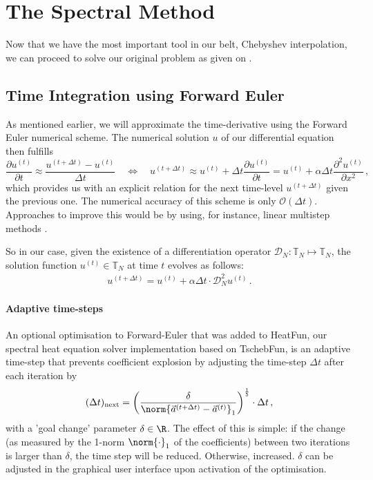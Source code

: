 \documentclass[12pt, a4paper]{article}
\newcommand{\chebyshev}{Chebyshev\xspace}
\newcommand{\tschebfun}{\textcolor{themecolor3}{TschebFun}\xspace}
\newcommand{\heatfun}{\textcolor{themecolor3}{HeatFun}\xspace}
\begin{document}

  \section{The Spectral Method}
  Now that we have the most important tool in our belt, \chebyshev interpolation, we can proceed to solve our original problem as given on .

  \subsection{Time Integration using Forward Euler}
  As mentioned earlier, we will approximate the time-derivative using the Forward Euler numerical scheme.
  The numerical solution $u$ of our differential equation then fulfills
  $$\frac{\partial u^{(t)}}{\partial t} \approx \frac{u^{(t+\Delta t)} - u^{(t)}}{\Delta t} \quad\Leftrightarrow\quad u^{(t+\Delta t)} \approx u^{(t)} + \Delta t \frac{\partial u^{(t)}}{\partial t} = u^{(t)} + \alpha \Delta t \frac{\partial^2 u^{(t)}}{\partial x^2} \,,$$
  which provides us with an explicit relation for the next time-level $u^{(t+\Delta t)}$ given the previous one.
  The numerical accuracy of this scheme is only $\mathcal{O}(\Delta t)$.
  Approaches to improve this would be by using, for instance, linear multistep methods \parencite{süli_mayers_2003}.

  So in our case, given the existence of a differentiation operator $\mathcal{D}_N: \mathbb{T}_N \mapsto \mathbb{T}_N$, the solution function $u^{(t)} \in \mathbb{T}_N$ at time $t$ evolves as follows:
  \begin{align*}
    u^{(t+\Delta t)} = u^{(t)} + \alpha \Delta t \cdot \mathcal{D}_N^2 u^{(t)} \,.
  \end{align*}

  \paragraph{Adaptive time-steps}
  An optional optimisation to Forward-Euler that was added to \heatfun, our spectral heat equation solver implementation based on \tschebfun, is an adaptive time-step that prevents coefficient explosion by adjusting the time-step $\Delta t$ after each iteration by
  $$(\Delta t)_{\text{next}} = \left(\frac{\delta}{\norm{\vec{a}^{(t+\Delta t)} - \vec{a}^{(t)}}_1}\right)^{\frac{1}{5}} \cdot \Delta t \,,$$
  with a 'goal change' parameter $\delta \in \R$.
  The effect of this is simple: if the change (as measured by the 1-norm $\norm{\cdot}_1$ of the coefficients) between two iterations is larger than $\delta$, the time step will be reduced. Otherwise, increased.
  $\delta$ can be adjusted in the graphical user interface upon activation of the optimisation.
\end{document}
